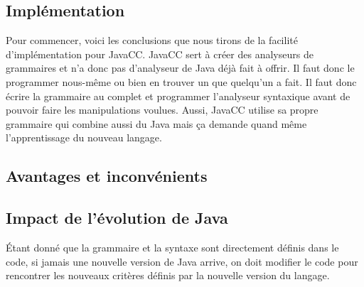 \documentclass[11pt,french]{article}
\begin{document}
        \subsection{Implémentation} %
        \label{sub:implementation}
        Pour commencer, voici les conclusions que nous tirons de la facilité d'implémentation pour JavaCC.
        JavaCC sert à créer des analyseurs de grammaires et n'a donc pas d'analyseur de Java déjà fait à
        offrir. Il faut donc le programmer nous-même ou bien en trouver un que quelqu'un a fait. Il faut donc
        écrire la grammaire au complet et programmer l'analyseur syntaxique avant de pouvoir faire les manipulations
        voulues. Aussi, JavaCC utilise sa propre grammaire qui combine aussi du Java mais ça demande quand même
        l'apprentissage du nouveau langage.
        \subsection{Avantages et inconvénients} %
        \label{sub:avantages-inconvenients}


        \subsection{Impact de l'évolution de Java} %
        \label{sub:impact-evolution-java}
        Étant donné que la grammaire et la syntaxe sont directement définis dans le code, si jamais une nouvelle version
        de Java arrive, on doit modifier le code pour rencontrer les nouveaux critères définis par la nouvelle version du
        langage.
\end{document}
